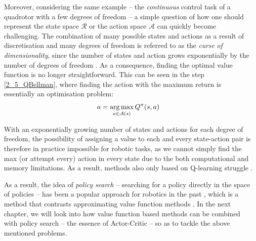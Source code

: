 Moreover, considering the same example -- the \textit{continuous} control task of a quadrotor with a few degrees of freedom -- a simple question of how one should represent the state space $\mathcal{R}$ or the action space $\mathcal{A}$ can quickly become challenging. The combination of many possible states and actions as a result of discretisation and many degrees of freedom is referred to as the \textit{curse of dimensionality}, since the number of states and action grows exponentially by the number of degrees of freedom \cite{BellmanDreyfus1962Book}. As a consequence, finding the optimal value function is no longer straightforward. This can be seen in the step \eqref{2_5_QBellman}, where finding the action with the maximum return is essentially an optimisation problem:
\begin{equation}
    a = \operatorname*{arg\,max}_{a\in \mathcal{A}(s)} Q^\pi(s,a)
\end{equation}

With an exponentially growing number of states and actions for each degree of freedom, the possibility of assigning a value to each and every state-action pair is therefore in practice impossible for robotic tasks, as we cannot simply find the max (or attempt every) action in every state due to the both computational and memory limitations. 
As a result, methods also only based on Q-learning struggle \cite{DQN}.

As a result, the idea of \textit{policy search} -- searching for a policy directly in the space of policies -- has been a popular approach for robotics in the past \cite{Gullapalli1994, Miyamoto1996}, which is a method that contrasts approximating value function methods \cite{BagnellPolicySearch2003}. In the next chapter, we will look into how value function based methods can be combined with policy search -- the essence of Actor-Critic -- so as to tackle the above mentioned problems. 